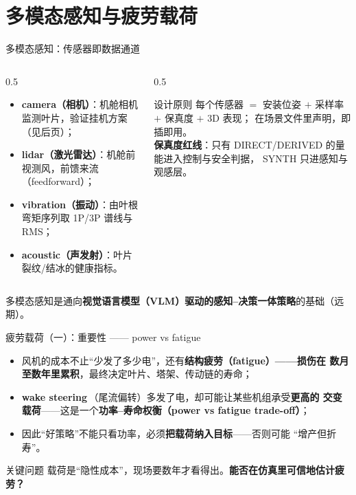 \documentclass[aspectratio=169,10pt,UTF8]{ctexbeamer}
\newcommand{\hl}[1]{{\color{myblue}\bfseries #1}}
\newcommand{\hlr}[1]{{\color{myred}\bfseries #1}}
\newcommand{\term}[2]{\textbf{#1}\,（#2）}
\begin{document}
\section{多模态感知与疲劳载荷}

\begin{frame}{多模态感知：传感器即数据通道}
  \begin{columns}[T]
    \begin{column}{0.5\textwidth}
      \begin{itemize}\small
        \item \hl{camera（相机）}：机舱相机监测叶片，验证挂机方案（见后页）；
        \item \hl{lidar（激光雷达）}：机舱前视测风，前馈来流（feedforward）；
        \item \hl{vibration（振动）}：由叶根弯矩序列取 1P/3P 谱线与 RMS；
        \item \hl{acoustic（声发射）}：叶片裂纹/结冰的健康指标。
      \end{itemize}
    \end{column}
    \begin{column}{0.5\textwidth}
      \begin{block}{设计原则}
        \small 每个传感器 $=$ 安装位姿 $+$ 采样率 $+$ 保真度 $+$ 3D 表现；
        在场景文件里声明，即插即用。\\[0.3em]
        \hlr{保真度红线}：只有 DIRECT/DERIVED 的量能进入控制与安全判据，
        SYNTH 只进感知与观感层。
      \end{block}
    \end{column}
  \end{columns}
  \vfill
  \begin{center}\small
    多模态感知是通向\textbf{视觉语言模型（VLM）驱动的感知–决策一体策略}的基础（远期）。
  \end{center}
\end{frame}

\begin{frame}{疲劳载荷（一）：重要性 —— power vs fatigue}
  \begin{itemize}\small
    \item 风机的成本不止“少发了多少电”，还有\hlr{结构疲劳（fatigue）——损伤在
          数月至数年里累积}，最终决定叶片、塔架、传动链的寿命；
    \item \term{wake steering}{尾流偏转}多发了电，却可能让某些机组承受\textbf{更高的
          交变载荷}——这是一个\hl{功率–寿命权衡（power vs fatigue trade-off）}；
    \item 因此“好策略”不能只看功率，必须\textbf{把载荷纳入目标}——否则可能
          “增产但折寿”。
  \end{itemize}
  \vfill
  \begin{block}{关键问题}
    \small 载荷是“隐性成本”，现场要数年才看得出。\hl{能否在仿真里可信地估计疲劳？}
  \end{block}
\end{frame}
\end{document}
